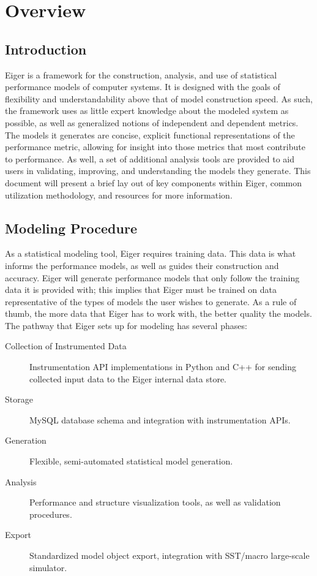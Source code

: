 \section{Overview}
\label{sec:over}
\subsection{Introduction}
Eiger is a framework for the construction, analysis, and use of
statistical performance models of computer systems.  It is designed with
the goals of flexibility and understandability above that of model
construction speed.  As such, the framework uses as little expert
knowledge about the modeled system as possible, as well as generalized
notions of independent and dependent metrics. The models it generates
are concise, explicit functional representations of the performance
metric, allowing for insight into those metrics that most contribute to
performance. As well, a set of additional analysis tools are provided to
aid users in validating, improving, and understanding the models they
generate. This document will present a brief lay out of key components
within Eiger, common utilization methodology, and resources for more
information.

\subsection{Modeling Procedure}
As a statistical modeling tool, Eiger requires training data. This data
is what informs the performance models, as well as guides their
construction and accuracy.  Eiger will generate performance models that
only follow the training data it is provided with; this implies that
Eiger must be trained on data representative of the types of models the
user wishes to generate. As a rule of thumb, the more data that Eiger
has to work with, the better quality the models. The pathway that Eiger
sets up for modeling has several phases:

	\begin{description}
		\item[Collection of Instrumented Data]
		Instrumentation API implementations in Python and C++ for sending collected input data to the Eiger internal data store.
		\item[Storage]
		MySQL database schema and integration with instrumentation
		APIs.
		\item[Generation]
		Flexible, semi-automated statistical model generation.
		\item[Analysis]
		Performance and structure visualization tools, as well as
		validation procedures.
		\item[Export]
		Standardized model object export, integration with SST/macro
		large-scale simulator.
	\end{description}

